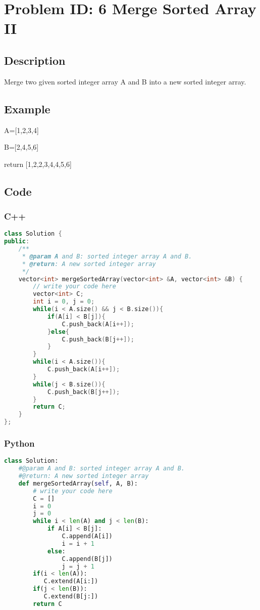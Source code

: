 \section{Problem ID: 6  Merge Sorted Array II}
\subsection{Description}
Merge two given sorted integer array A and B into a new sorted integer array.

\subsection{Example}
A=[1,2,3,4]

B=[2,4,5,6]

return [1,2,2,3,4,4,5,6]

\subsection{Code}
\scriptsize
\subsubsection{C++}
\begin{lstlisting}[language=C++]
class Solution {
public:
    /**
     * @param A and B: sorted integer array A and B.
     * @return: A new sorted integer array
     */
    vector<int> mergeSortedArray(vector<int> &A, vector<int> &B) {
        // write your code here
        vector<int> C;
        int i = 0, j = 0;
        while(i < A.size() && j < B.size()){
            if(A[i] < B[j]){
                C.push_back(A[i++]);
            }else{
                C.push_back(B[j++]);
            }
        }
        while(i < A.size()){
            C.push_back(A[i++]);
        }
        while(j < B.size()){
            C.push_back(B[j++]);
        }
        return C;
    }
};
\end{lstlisting}

\subsubsection{Python}
\begin{lstlisting}[language=Python]
class Solution:
    #@param A and B: sorted integer array A and B.
    #@return: A new sorted integer array
    def mergeSortedArray(self, A, B):
        # write your code here
        C = []
        i = 0
        j = 0
        while i < len(A) and j < len(B):
            if A[i] < B[j]:
                C.append(A[i])
                i = i + 1
            else:
                C.append(B[j])
                j = j + 1
        if(i < len(A)):
           C.extend(A[i:])
        if(j < len(B)):
           C.extend(B[j:])
        return C
\end{lstlisting}
\normalsize 